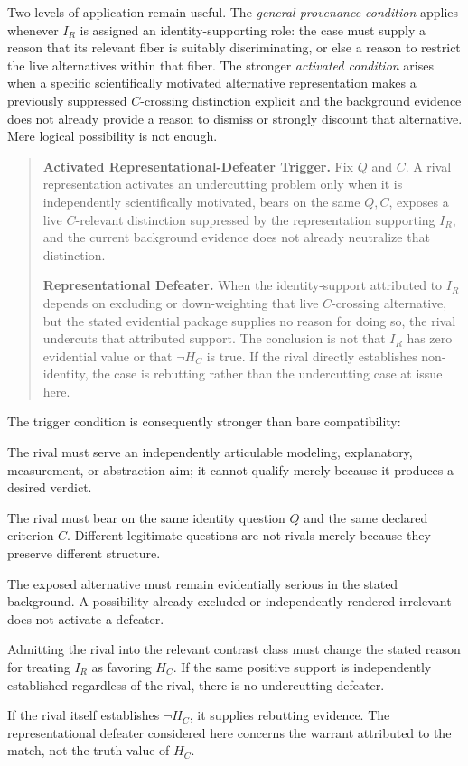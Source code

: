 \documentclass[11pt]{article}
\begin{document}
Two levels of application remain useful. The \emph{general provenance condition} applies whenever \(I_R\) is assigned an identity-supporting role: the case must supply a reason that its relevant fiber is suitably discriminating, or else a reason to restrict the live alternatives within that fiber. The stronger \emph{activated condition} arises when a specific scientifically motivated alternative representation makes a previously suppressed \(C\)-crossing distinction explicit and the background evidence does not already provide a reason to dismiss or strongly discount that alternative. Mere logical possibility is not enough.

\begin{quote}
\textbf{Activated Representational-Defeater Trigger.} Fix \(Q\) and \(C\). A rival representation activates an undercutting problem only when it is independently scientifically motivated, bears on the same \(Q,C\), exposes a live \(C\)-relevant distinction suppressed by the representation supporting \(I_R\), and the current background evidence does not already neutralize that distinction.

\textbf{Representational Defeater.} When the identity-support attributed to \(I_R\) depends on excluding or down-weighting that live \(C\)-crossing alternative, but the stated evidential package supplies no reason for doing so, the rival undercuts that attributed support. The conclusion is not that \(I_R\) has zero evidential value or that \(\neg H_C\) is true. If the rival directly establishes non-identity, the case is rebutting rather than the undercutting case at issue here.
\end{quote}

The trigger condition is consequently stronger than bare compatibility:
\begin{description}[leftmargin=!,labelwidth=3.3cm]
\item[Scientifically motivated.] The rival must serve an independently articulable modeling, explanatory, measurement, or abstraction aim; it cannot qualify merely because it produces a desired verdict.
\item[Same question and criterion.] The rival must bear on the same identity question \(Q\) and the same declared criterion \(C\). Different legitimate questions are not rivals merely because they preserve different structure.
\item[Live contrast.] The exposed alternative must remain evidentially serious in the stated background. A possibility already excluded or independently rendered irrelevant does not activate a defeater.
\item[Support-changing.] Admitting the rival into the relevant contrast class must change the stated reason for treating \(I_R\) as favoring \(H_C\). If the same positive support is independently established regardless of the rival, there is no undercutting defeater.
\item[No automatic rebuttal.] If the rival itself establishes \(\neg H_C\), it supplies rebutting evidence. The representational defeater considered here concerns the warrant attributed to the match, not the truth value of \(H_C\).
\end{description}
\end{document}
